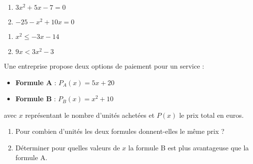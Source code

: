 \documentclass[11pt]{article}
\begin{document}
\phantom{0}
\vspace{-1.5cm}

\begin{center}
\recherche 
{}
\end{center}

\begin{exercicedevoir}
\begin{multicols}{2}
\begin{enumerate}
\item $3x^2+5x-7=0$
\item $-25-x^2+10x=0$
\end{enumerate}
\end{multicols}
\end{exercicedevoir}

\begin{exercicedevoir}
\begin{multicols}{2}
\begin{enumerate}
\item $x^2 \leq -3x-14$
\item $9x < 3x^2-3$
\end{enumerate}
\end{multicols}
\end{exercicedevoir}

\begin{exercicedevoir}

Une entreprise propose deux options de paiement pour un service :

\begin{itemize}
    \item \textbf{Formule A} : $P_A(x) = 5x + 20$
    \item \textbf{Formule B} : $P_B(x) = x^2 + 10$
\end{itemize}

avec $x$ représentant le nombre d'unités achetées et $P(x)$ le prix total en euros.

\begin{enumerate}
    \item Pour combien d'unités les deux formules donnent-elles le même prix ?
    \item Déterminer pour quelles valeurs de $x$ la formule B est plus avantageuse que la formule A.
\end{enumerate}
\end{exercicedevoir}
\end{document}
